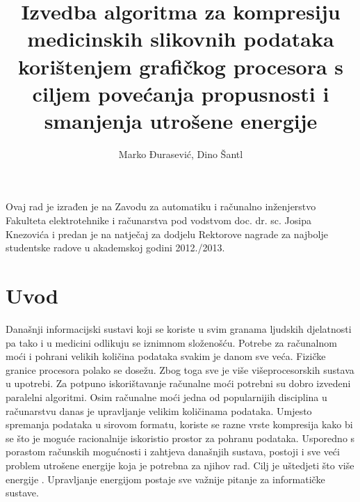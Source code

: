 \documentclass[times, utf8, zavrsni, numeric, sort]{fer}
\begin{document}
\title{Izvedba algoritma za kompresiju medicinskih slikovnih podataka korištenjem grafičkog procesora s ciljem povećanja propusnosti i smanjenja utrošene energije}

\author{Marko Đurasević, Dino Šantl}

\maketitle

\newpage
\thispagestyle{empty}
\vspace*{\fill}
Ovaj rad je izrađen je na Zavodu za automatiku i računalno inženjerstvo Fakulteta elektrotehnike i računarstva pod vodstvom doc. dr. sc. Josipa Knezovića i predan je na natječaj za dodjelu Rektorove nagrade za najbolje studentske radove u akademskoj godini 2012./2013.
\par \hfil
\vspace*{\fill}

\listoftables

\listoffigures

\tableofcontents

\chapter{Uvod}

Današnji informacijski sustavi koji se koriste u svim granama ljudskih djelatnosti pa tako i u medicini odlikuju se iznimnom složenošću. Potrebe za računalnom moći i pohrani velikih količina podataka svakim je danom sve veća. Fizičke granice procesora polako se dosežu. Zbog toga sve je više višeprocesorskih sustava u upotrebi. Za potpuno iskorištavanje računalne moći potrebni su dobro izvedeni paralelni algoritmi. Osim računalne moći jedna od popularnijih disciplina u računarstvu danas je upravljanje velikim količinama podataka. Umjesto spremanja podataka u sirovom formatu, koriste se razne vrste kompresija kako bi se što je moguće racionalnije iskoristio prostor za pohranu podataka. Usporedno s porastom računskih mogućnosti i zahtjeva današnjih sustava, postoji i sve veći problem utrošene energije koja je potrebna za njihov rad. Cilj je uštedjeti što više energije \cite{Tariq:12}. Upravljanje energijom postaje sve važnije pitanje za informatičke sustave.
\end{document}
